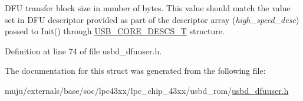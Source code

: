D\+FU transfer block size in number of bytes. This value should match the value set in D\+FU descriptor provided as part of the descriptor array ({\itshape high\+\_\+speed\+\_\+desc}) passed to Init() through \hyperlink{group___u_s_b_d___core_gabdc617d119eac0555f91bea957c41ecc}{U\+S\+B\+\_\+\+C\+O\+R\+E\+\_\+\+D\+E\+S\+C\+S\+\_\+T} structure. 

Definition at line 74 of file usbd\+\_\+dfuuser.\+h.



The documentation for this struct was generated from the following file\+:\begin{DoxyCompactItemize}
\item 
muju/externals/base/soc/lpc43xx/lpc\+\_\+chip\+\_\+43xx/usbd\+\_\+rom/\hyperlink{usbd__dfuuser_8h}{usbd\+\_\+dfuuser.\+h}\end{DoxyCompactItemize}
